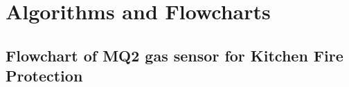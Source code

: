 \documentclass[12pt,a4paper]{report}
\begin{document}
	
	
	
	
	\pagebreak    
	\section{Algorithms and Flowcharts}
	\vspace{10pt}
	
	
	
	\subsection{Flowchart of MQ2 gas sensor for Kitchen Fire Protection}
	
	
	
\end{document}

